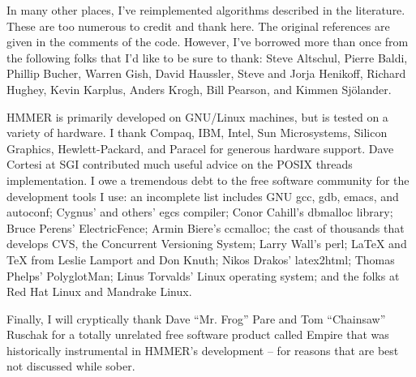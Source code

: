 In many other places, I've reimplemented algorithms described in the
literature. These are too numerous to credit and thank here. The
original references are given in the comments of the code. However,
I've borrowed more than once from the following folks that I'd like to
be sure to thank: Steve Altschul, Pierre Baldi, Phillip Bucher, Warren
Gish, David Haussler, Steve and Jorja Henikoff, Richard Hughey, Kevin
Karplus, Anders Krogh, Bill Pearson, and Kimmen Sj\"{o}lander.

HMMER is primarily developed on GNU/Linux machines, but is tested on a
variety of hardware. I thank Compaq, IBM, Intel, Sun Microsystems,
Silicon Graphics, Hewlett-Packard, and Paracel for generous hardware
support. Dave Cortesi at SGI contributed much useful advice on the
POSIX threads implementation. I owe a tremendous debt to the free
software community for the development tools I use: an incomplete list
includes GNU gcc, gdb, emacs, and autoconf; Cygnus' and others' egcs
compiler; Conor Cahill's dbmalloc library; Bruce Perens'
ElectricFence; Armin Biere's ccmalloc; the cast of thousands that
develops CVS, the Concurrent Versioning System; Larry Wall's perl;
LaTeX and TeX from Leslie Lamport and Don Knuth; Nikos Drakos'
latex2html; Thomas Phelps' PolyglotMan; Linus Torvalds' Linux
operating system; and the folks at Red Hat Linux and Mandrake Linux.

Finally, I will cryptically thank Dave ``Mr. Frog'' Pare and Tom
``Chainsaw'' Ruschak for a totally unrelated free software product
called Empire that was historically instrumental in HMMER's
development -- for reasons that are best not discussed while sober.

